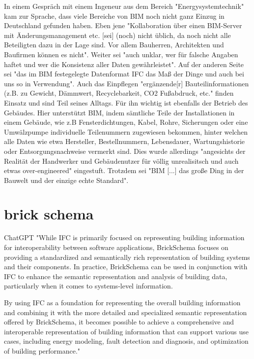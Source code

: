 In einem Gespräch mit einem Ingeneur aus dem Bereich "Energysystemtechnik" kam zur Sprache, dass viele Bereiche von BIM noch nicht ganz Einzug in Deutschland gefunden haben.
Eben jene "Kollaboration über einen BIM-Server mit Änderungsmanagement etc. [sei] (noch) nicht üblich, da noch nicht alle Beteiligten dazu in der Lage sind. Vor allem Bauherren, Architekten und Baufirmen können es nicht".
Weiter sei "auch unklar, wer für falsche Angaben haftet und wer die Konsistenz aller Daten gewährleistet".
Auf der anderen Seite sei "das im BIM festegelegte Datenformat IFC das Maß der Dinge und auch bei uns so in Verwendung".
Auch das Einpflegen "ergänzende[r] Bauteilinformationen (z.B. zu Gewicht, Dämmwert, Recyclebarkeit, CO2 Fußabdruck, etc." finden Einsatz und sind Teil seines Alltags.
Für ihn wichtig ist ebenfalls der Betrieb des Gebäudes.
Hier unterstützt BIM, indem sämtliche Teile der Installationen in einem Gebäude, wie z.B Fensterdichtungen, Kabel, Rohre, Sicherungen oder eine Umwälzpumpe individuelle Teilenummern zugewiesen bekommen, hinter welchen alle Daten wie etwa Hersteller, Bestellnummern, Lebensdauer, Wartungshistorie oder Entsorgungsnachweise vermerkt sind.
Dies wurde allerdings "angesichts der Realität der Handwerker und Gebäudenutzer für völlig unrealisitsch und auch etwas over-engineered" eingestuft.
Trotzdem sei "BIM [...] das große Ding in der Bauwelt und der einzige echte Standard".

\section{brick schema}
ChatGPT "While IFC is primarily focused on representing building information for interoperability between software applications, BrickSchema focuses on providing a standardized and semantically rich representation of building systems and their components. In practice, BrickSchema can be used in conjunction with IFC to enhance the semantic representation and analysis of building data, particularly when it comes to systems-level information.

By using IFC as a foundation for representing the overall building information and combining it with the more detailed and specialized semantic representation offered by BrickSchema, it becomes possible to achieve a comprehensive and interoperable representation of building information that can support various use cases, including energy modeling, fault detection and diagnosis, and optimization of building performance."

